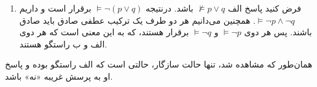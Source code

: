 \begin{ans}
\begin{enumerate}
\begin{enumerate}
      \item فرض کنید پاسخ الف $\not \models p \vee q$
      باشد. درنتیجه
      $\models \neg (p \vee q)$
      برقرار است و داریم
      $\models \neg p \wedge \neg q$.
      همچنین می‌دانیم هر دو طرف یک ترکیب عطفی صادق باید صادق باشند. پس هر دوی
      $\models \neg p$
      و
      $\models \neg q$
      برقرار هستند، که به این معنی است که هر دوی الف و ب راستگو هستند.
    \end{enumerate}
  \end{enumerate}
  همان‌طور که مشاهده شد، تنها حالت سازگار، حالتی است که الف راستگو بوده و پاسخ او به پرسش غریبه «نه» باشد.
\end{ans}